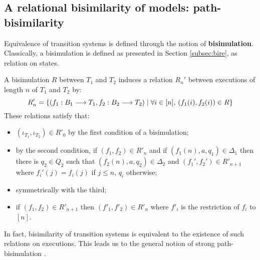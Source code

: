 


\subsection{A relational bisimilarity of models: path-bisimilarity}


Equivalence of transition systems is defined through the notion of \textbf{bisimulation}. Classically, a bisimulation is defined as presented in Section \ref{subsec:bire}, as relation on states.

A bisimulation $R$ between $T_1$ and $T_2$ induces a relation $R_n'$ between executions of length $n$ of $T_1$ and $T_2$ by:
$$R_n' = \{(f_1 : B_1 \longrightarrow T_1,f_2 : B_2 \longrightarrow T_2) \mid \forall i \in [n], \, (f_1(i),f_2(i)) \in R\}$$
These relations satisfy that:
\begin{itemize}
	\item $(\iota_{T_1},\iota_{T_2}) \in R'_0$ by the first condition of a bisimulation;
	\item by the second condition, if $(f_1,f_2) \in R'_n$ and if $(f_1(n), a, q_1)\in \Delta_1$ then there is $q_2 \in Q_2$ such that $(f_2(n), a, q_2)\in \Delta_2$ and $(f_1',f_2') \in R'_{n+1}$ where $f_i'(j) = f_i(j)$ if $j \leq n$, $q_i$ otherwise;
	\item symmetrically with the third;
	\item if $(f_1,f_2) \in R'_{n+1}$ then $(f'_1,f'_2) \in R'_n$ where $f'_i$ is the restriction of $f_i$ to $[n]$.
\end{itemize}

In fact, bisimilarity of transition systems is equivalent to the existence of such relations on executions. This leads us to the general notion of strong path-bisimulation \cite{joyal96}.

